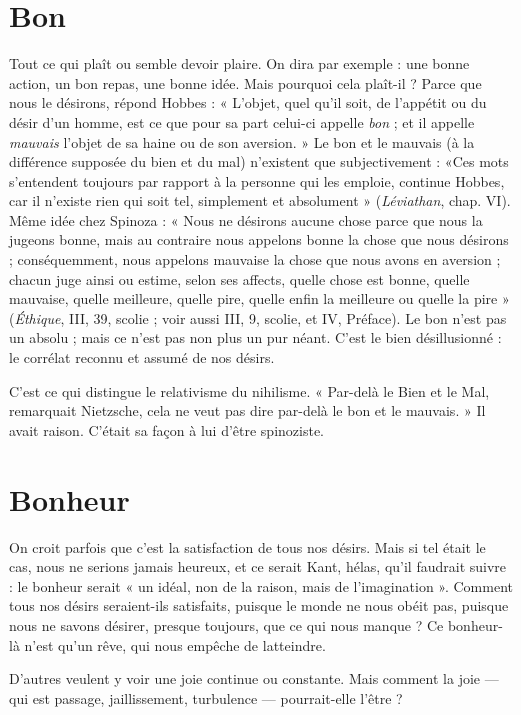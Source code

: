 \section{Bon}
Tout ce qui plaît ou semble devoir plaire. On dira par exemple : une
bonne action, un bon repas, une bonne idée. Mais pourquoi cela plaît-il ?
Parce que nous le désirons, répond Hobbes : « L'objet, quel qu’il soit, de
l'appétit ou du désir d’un homme, est ce que pour sa part celui-ci appelle {\it bon} ;
et il appelle {\it mauvais} l’objet de sa haine ou de son aversion. » Le bon et le mauvais
(à la différence supposée du bien et du mal) n’existent que subjectivement :
«Ces mots s'entendent toujours par rapport à la personne qui les emploie,
continue Hobbes, car il n'existe rien qui soit tel, simplement et absolument »
({\it Léviathan}, chap. VI). Même idée chez Spinoza : « Nous ne désirons aucune
chose parce que nous la jugeons bonne, mais au contraire nous appelons bonne
la chose que nous désirons ; conséquemment, nous appelons mauvaise la chose
que nous avons en aversion ; chacun juge ainsi ou estime, selon ses affects,
quelle chose est bonne, quelle mauvaise, quelle meilleure, quelle pire, quelle
enfin la meilleure ou quelle la pire » ({\it Éthique}, III, 39, scolie ; voir aussi III, 9,
scolie, et IV, Préface). Le bon n’est pas un absolu ; mais ce n’est pas non plus
un pur néant. C’est le bien désillusionné : le corrélat reconnu et assumé de nos
désirs.

C’est ce qui distingue le relativisme du nihilisme. « Par-delà le Bien et le
Mal, remarquait Nietzsche, cela ne veut pas dire par-delà le bon et le mauvais. »
Il avait raison. C’était sa façon à lui d’être spinoziste.

\section{Bonheur}
On croit parfois que c’est la satisfaction de tous nos désirs. Mais
si tel était le cas, nous ne serions jamais heureux, et ce serait
Kant, hélas, qu’il faudrait suivre : le bonheur serait « un idéal, non de la raison,
mais de l’imagination ». Comment tous nos désirs seraient-ils satisfaits, puisque
le monde ne nous obéit pas, puisque nous ne savons désirer, presque toujours,
que ce qui nous manque ? Ce bonheur-là n’est qu’un rêve, qui nous empêche
de latteindre.

D’autres veulent y voir une joie continue ou constante. Mais comment la
joie — qui est passage, jaillissement, turbulence — pourrait-elle l'être ?

